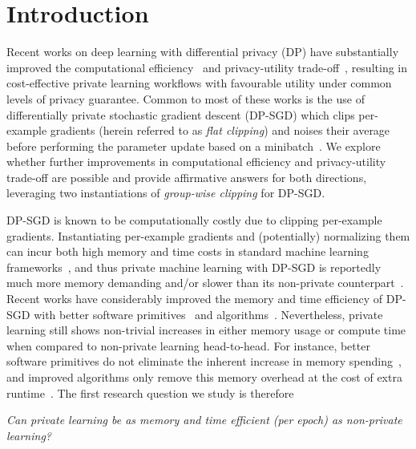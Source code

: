 \section{Introduction}
Recent works on deep learning with differential privacy (DP) have substantially improved the computational efficiency~\citep{subramani2021enabling,anil2021large} and privacy-utility trade-off~\citep{li2022does,yu2022differentially,de2022unlocking,mehta2022large}, resulting in cost-effective private learning workflows with favourable utility under common levels of privacy guarantee. 
Common to most of these works is the use of differentially private stochastic gradient descent (DP-SGD) which clips per-example gradients (herein referred to as \emph{flat clipping}) and noises their average before performing the parameter update based on a minibatch~\citep{song2013stochastic,bassily2014private,abadi2016deep}.
We explore whether further improvements in computational efficiency and privacy-utility trade-off are possible and provide affirmative answers for both directions, leveraging two instantiations of \emph{group-wise clipping} for DP-SGD. 


DP-SGD is known to be computationally costly due to clipping per-example gradients.
Instantiating per-example gradients and (potentially) normalizing them can incur both high memory and time costs in standard machine learning frameworks~\citep{paszke2019pytorch,frostig2018compiling}, and thus private machine learning with DP-SGD is reportedly much more memory demanding and/or slower than its non-private counterpart~\citep{carlini2019secret,hoory2021learning}. 
Recent works have considerably improved the memory and time efficiency of DP-SGD with better software primitives~\citep{subramani2021enabling} and algorithms~\citep{yousefpour2021opacus,lee2021scaling,li2022large,bu2022scalable}.
Nevertheless, private learning still shows non-trivial increases in either memory usage or compute time when compared to non-private learning head-to-head. 
For instance, better software primitives do not eliminate the inherent increase in memory spending~\citep{subramani2021enabling}, and improved algorithms only remove this memory overhead at the cost of extra runtime~\citep{li2022large}. 
The first research question we study is therefore
\renewenvironment{quote}
  {\list{}{\rightmargin=0.1in \leftmargin=0.1in}%
  \item\relax}
  {\endlist}
\begin{quote}
	\centering
	\emph{\footnotesize Can private learning be as memory and time efficient (per epoch) as non-private learning?}
\end{quote}

